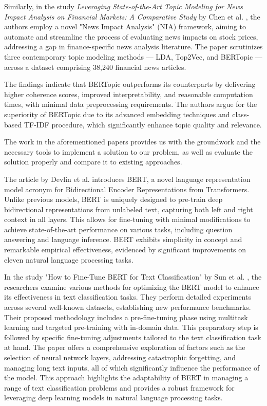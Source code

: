 \documentclass[fleqn,moreauthors,10pt]{ds_report}
\begin{document}
Similarly, in the study \textit{Leveraging State-of-the-Art Topic Modeling for News Impact Analysis on Financial Markets: A Comparative Study} by Chen et al. \cite{NIAframework}, the authors employ a novel "News Impact Analysis" (NIA) framework, aiming to automate and streamline the process of evaluating news impacts on stock prices, addressing a gap in finance-specific news analysis literature. The paper scrutinizes three contemporary topic modeling methods — LDA, Top2Vec, and BERTopic — across a dataset comprising 38,240 financial news articles. 

The findings indicate that BERTopic outperforms its counterparts by delivering higher coherence scores, improved interpretability, and reasonable computation times, with minimal data preprocessing requirements. The authors argue for the superiority of BERTopic due to its advanced embedding techniques and class-based TF-IDF procedure, which significantly enhance topic quality and relevance.

The work in the aforementioned papers provides us with the groundwork and the necessary tools to implement a solution to our problem, as well as evaluate the solution properly and compare it to existing approaches. 
\fi



The article by Devlin et al. \cite{devlin2019bert} introduces BERT, a novel language representation model acronym for Bidirectional Encoder Representations from Transformers. Unlike previous models, BERT is uniquely designed to pre-train deep bidirectional representations from unlabeled text, capturing both left and right context in all layers. This allows for fine-tuning with minimal modifications to achieve state-of-the-art performance on various tasks, including question answering and language inference. BERT exhibits simplicity in concept and remarkable empirical effectiveness, evidenced by significant improvements on eleven natural language processing tasks. 

In the study "How to Fine-Tune BERT for Text Classification" by Sun et al. \cite{sun2020finetune}, the researchers examine various methods for optimizing the BERT model to enhance its effectiveness in text classification tasks. They perform detailed experiments across several well-known datasets, establishing new performance benchmarks. Their proposed methodology includes a pre-fine-tuning phase using multitask learning and targeted pre-training with in-domain data. This preparatory step is followed by specific fine-tuning adjustments tailored to the text classification task at hand. The paper offers a comprehensive exploration of factors such as the selection of neural network layers, addressing catastrophic forgetting, and managing long text inputs, all of which significantly influence the performance of the model. This approach highlights the adaptability of BERT in managing a range of text classification problems and provides a robust framework for leveraging deep learning models in natural language processing tasks.
\end{document}
